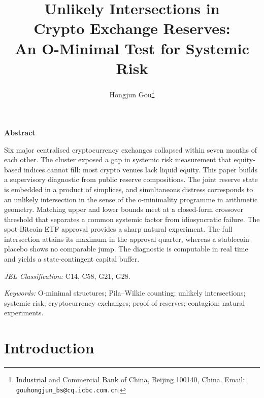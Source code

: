 \documentclass[12pt]{article}
\date{}
\theoremstyle{sampledef}
\theoremstyle{sampleplain}
\theoremstyle{sampleremark}
\newcommand{\1}{\mathbf{1}}
\begin{document}
\title{Unlikely Intersections in\\ Crypto Exchange Reserves:\\
An O-Minimal Test for Systemic Risk}

\author{Hongjun Gou\thanks{Industrial and Commercial Bank of China,
  Beijing 100140, China. Email: \texttt{gouhongjun\_bs@cq.icbc.com.cn}.}}

\maketitle

\begin{center}\textbf{Abstract}\end{center}

Six major centralised cryptocurrency exchanges collapsed within
seven months of each other. The cluster exposed a gap in systemic
risk measurement that equity-based indices cannot fill: most crypto
venues lack liquid equity. This paper builds a supervisory
diagnostic from public reserve compositions. The joint reserve
state is embedded in a product of simplices, and simultaneous
distress corresponds to an unlikely intersection in the sense of
the o-minimality programme in arithmetic geometry. Matching upper
and lower bounds meet at a closed-form crossover threshold that
separates a common systemic factor from idiosyncratic failure. The
spot-Bitcoin ETF approval provides a sharp natural experiment. The
full intersection attains its maximum in the approval quarter,
whereas a stablecoin placebo shows no comparable jump. The
diagnostic is computable in real time and yields a state-contingent
capital buffer.

\vspace{1em}
\noindent\emph{JEL Classification:} C14, C58, G21, G28.

\vspace{0.5em}
\noindent\emph{Keywords:} O-minimal structures; Pila--Wilkie
counting; unlikely intersections; systemic risk; cryptocurrency
exchanges; proof of reserves; contagion; natural experiments.

\bigskip

\section{Introduction}\label{sec:intro}
\end{document}
